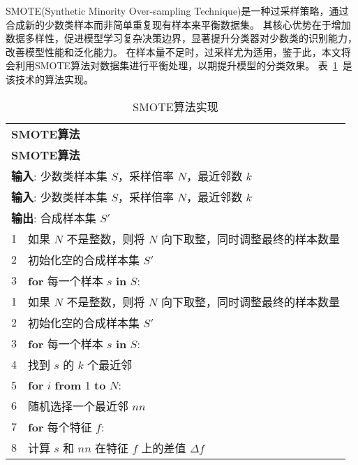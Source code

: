 SMOTE(Synthetic Minority Over-sampling Technique)是一种过采样策略，通过合成新的少数类样本而非简单重复现有样本来平衡数据集。
其核心优势在于增加数据多样性，促进模型学习复杂决策边界，显著提升分类器对少数类的识别能力，改善模型性能和泛化能力。
在样本量不足时，过采样尤为适用，鉴于此，本文将会利用SMOTE算法对数据集进行平衡处理，以期提升模型的分类效果。
表~\ref{tab:smote}~是该技术的算法实现。
\begin{table}[htbp]
	\caption{SMOTE算法实现}
	\label{tab:smote}
	\centering
	\begin{tabularx}{1.0\textwidth}{cl}
		\toprule
		\multicolumn{2}{l}{\textbf{SMOTE算法}}                                              \\
		\multicolumn{2}{l}{\textbf{SMOTE算法}}                                              \\
		\midrule
		\multicolumn{2}{l}{\textbf{输入}: 少数类样本集 $S$，采样倍率 $N$，最近邻数 $k$}     \\
		\multicolumn{2}{l}{\textbf{输入}: 少数类样本集 $S$，采样倍率 $N$，最近邻数 $k$}     \\
		\multicolumn{2}{l}{\textbf{输出}: 合成样本集 $S'$}                                  \\
		1  & 如果 $N$ 不是整数，则将 $N$ 向下取整，同时调整最终的样本数量                   \\
		2  & 初始化空的合成样本集 $S'$                                                      \\
		3  & \textbf{for} 每一个样本 $s$ \textbf{in} $S$:                                   \\
		1  & 如果 $N$ 不是整数，则将 $N$ 向下取整，同时调整最终的样本数量                   \\
		2  & 初始化空的合成样本集 $S'$                                                      \\
		3  & \textbf{for} 每一个样本 $s$ \textbf{in} $S$:                                   \\
		4  & \quad 找到 $s$ 的 $k$ 个最近邻                                                 \\
		5  & \quad \textbf{for} $i$ \textbf{from} 1 \textbf{to} $N$:                        \\
		6  & \quad\quad 随机选择一个最近邻 $nn$                                             \\
		7  & \quad\quad \textbf{for} 每个特征 $f$:                                          \\
		8  & \quad\quad\quad 计算 $s$ 和 $nn$ 在特征 $f$ 上的差值 $\Delta f$                \\

\end{tabularx}
\end{table}
